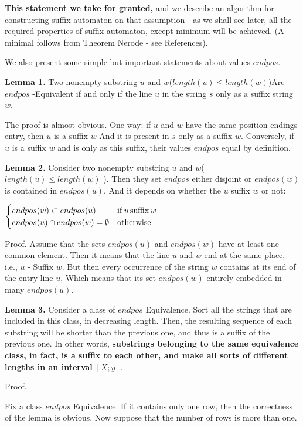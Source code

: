 \textbf{This statement we take for granted,} and we describe an algorithm for constructing suffix automaton on that assumption - as we shall see later, all the required properties of suffix automaton, except minimum will be achieved. (A minimal follows from Theorem Nerode - see References).

We also present some simple but important statements about values $endpos$.

\textbf{Lemma 1.} Two nonempty substring $u$ and $w$($length (u) \le length (w)$)Are $endpos$ -Equivalent if and only if the line $u$ in the string $s$ only as a suffix string $w$.

The proof is almost obvious. One way: if $u$ and $w$ have the same position endings entry, then $u$ is a suffix $w$ And it is present in $s$ only as a suffix $w$. Conversely, if $u$ is a suffix $w$ and is only as this suffix, their values $endpos$ equal by definition.

\textbf{Lemma 2.} Consider two nonempty substring $u$ and $w$($length (u) \le length (w)$ ). Then they set $endpos$ either disjoint or $endpos (w)$ is contained in $endpos (u)$, And it depends on whether the $u$ suffix $w$ or not:

$\begin{cases}
endpos(w)\subset endpos(u) & {\rm if}\, u\,{\rm suffix}\, w\\
endpos(u)\cap endpos(w)=\emptyset & {\rm otherwise}
\end{cases}$

Proof. Assume that the sets $endpos (u)$ and $endpos (w)$ have at least one common element. Then it means that the line $u$ and $w$ end at the same place, i.e., $u$ - Suffix $w$. But then every occurrence of the string $w$ contains at its end of the entry line $u$, Which means that its set $endpos (w)$ entirely embedded in many $endpos (u)$.

\textbf{Lemma 3.} Consider a class of $endpos$ Equivalence. Sort all the strings that are included in this class, in decreasing length. Then, the resulting sequence of each substring will be shorter than the previous one, and thus is a suffix of the previous one. In other words, \textbf{substrings belonging to the same equivalence class, in fact, is a suffix to each other, and make all sorts of different lengths in an interval} \textbf{$[X; y]$}.

Proof.

Fix a class $endpos$ Equivalence. If it contains only one row, then the correctness of the lemma is obvious. Now suppose that the number of rows is more than one.

